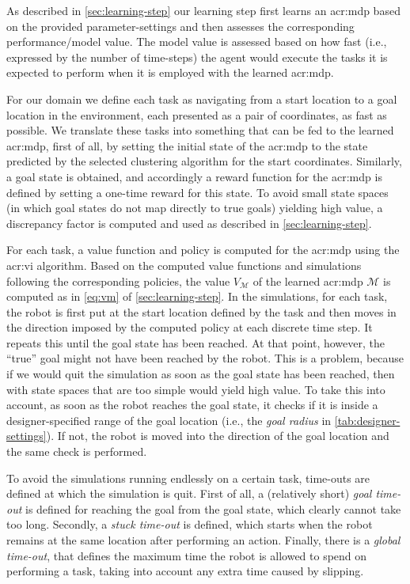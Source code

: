 As described in \autoref{sec:learning-step} our learning step first learns an \acrshort{acr:mdp} based on the provided parameter-settings and then assesses the corresponding performance/model value.
The model value is assessed based on how fast (i.e., expressed by the number of time-steps) the agent would execute the tasks it is expected to perform when it is employed with the learned \acrshort{acr:mdp}.

For our domain we define each task as navigating from a start location to a goal location in the environment, each presented as a pair of coordinates, as fast as possible.
We translate these tasks into something that can be fed to the learned \acrshort{acr:mdp}, first of all, by setting the initial state of the \acrshort{acr:mdp} to the state predicted by the selected clustering algorithm for the start coordinates.
Similarly, a goal state is obtained, and accordingly a reward function for the \acrshort{acr:mdp} is defined by setting a one-time reward for this state.
To avoid small state spaces (in which goal states do not map directly to true goals) yielding high value, a discrepancy factor is computed and used as described in \autoref{sec:learning-step}.

For each task, a value function and policy is computed for the \acrshort{acr:mdp} using the \acrshort{acr:vi} algorithm.
Based on the computed value functions and simulations following the corresponding policies, the value $V_\mathcal{M}$ of the learned \acrshort{acr:mdp} $\mathcal{M}$ is computed as in \autoref{eq:vm} of \autoref{sec:learning-step}.
In the simulations, for each task, the robot is first put at the start location defined by the task and then moves in the direction imposed by the computed policy at each discrete time step.
It repeats this until the goal state has been reached.
At that point, however, the ``true'' goal might not have been reached by the robot.
This is a problem, because if we would quit the simulation as soon as the goal state has been reached, then  with state spaces that are too simple would yield high value.
To take this into account, as soon as the robot reaches the goal state, it checks if it is inside a designer-specified range of the goal location (i.e., the \textit{goal radius} in \autoref{tab:designer-settings}).
If not, the robot is moved into the direction of the goal location and the same check is performed.

To avoid the simulations running endlessly on a certain task, time-outs are defined at which the simulation is quit.
First of all, a (relatively short) \textit{goal time-out} is defined for reaching the goal from the goal state, which clearly cannot take too long.
Secondly, a \textit{stuck time-out} is defined, which starts when the robot remains at the same location after performing an action.
Finally, there is a \textit{global time-out}, that defines the maximum time the robot is allowed to spend on performing a task, taking into account any extra time caused by slipping.


